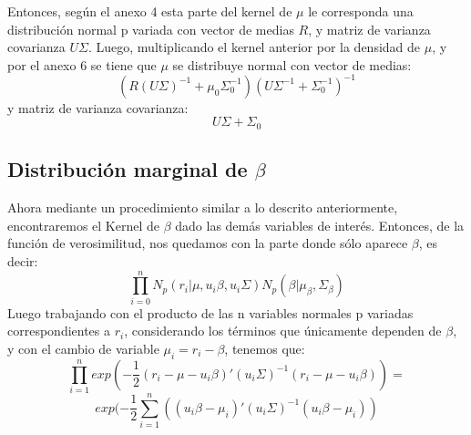 \documentclass[11pt]{book}
\begin{document}
Entonces, según el anexo 4 esta parte del kernel de $\mu$ le corresponda una distribución normal p variada con vector de medias $R$, y matriz de varianza covarianza $U\Sigma$. Luego, multiplicando el kernel anterior por la densidad de $\mu$, y por el anexo 6 se tiene que $\mu$ se distribuye normal con vector de medias:
\begin{equation*}
(R(U\Sigma)^{-1}+\mu_{0}\Sigma_{0}^{-1})(U\Sigma^{-1}+\Sigma_{0}^{-1})^{-1}
\end{equation*}
 y matriz de varianza covarianza:
 \begin{equation*}
 U\Sigma+\Sigma_{0}
 \end{equation*}

\subsection*{Distribución marginal de $\beta$}
Ahora mediante un procedimiento similar a lo descrito anteriormente, encontraremos el Kernel de $\beta$ dado las demás variables de interés. Entonces, de la función de verosimilitud, nos quedamos con la parte donde sólo aparece $\beta$, es decir:
\begin{equation*}
\prod_{i=0}^{n}N_{p}(r_{i}|\mu,u_{i}\beta,u_{i}\Sigma)N_{p}(\beta|\mu_{\beta},\Sigma_{\beta})
\end{equation*}
Luego trabajando con el producto de las n variables normales p variadas correspondientes a $r_{i}$,  considerando los términos que únicamente dependen de $\beta$, y con el cambio de variable $\mu_{i}=r_{i}-\beta$, tenemos que:
\begin{equation*}
\prod_{i=1}^{n}exp(-\dfrac{1}{2}(r_{i}-\mu-u_{i}\beta)'(u_{i}\Sigma)^{-1}(r_{i}-\mu-u_{i}\beta))=
\end{equation*}
\begin{equation*}
exp(-\frac{1}{2}\sum_{i=1}^{n}((u_{i}\beta-\mu_{i})'(u_{i}\Sigma)^{-1}(u_{i}\beta-\mu_{i}))
\end{equation*}
\end{document}
